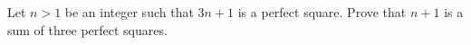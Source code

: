 Let $n>1$ be an integer such that $3n+1$ is a perfect square. Prove that $n+1$ is a sum of three perfect squares.
